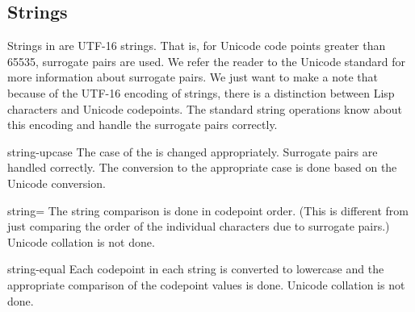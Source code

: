 \subsection{Strings}

Strings in \cmucl{} are UTF-16 strings.  That is, for Unicode code
points greater than 65535, surrogate pairs are used.  We refer the
reader to the Unicode standard for more information about surrogate
pairs.  We just want to make a note that because of the UTF-16
encoding of strings, there is a distinction between Lisp characters
and Unicode codepoints.  The standard string operations know about
this encoding and handle the surrogate pairs correctly.


\begin{defun}{}{string-upcase}{\args {} }
  The case of the  is changed appropriately.  Surrogate
  pairs are handled correctly.  The conversion to the appropriate case
  is done based on the Unicode conversion.
\end{defun}

\begin{defun}{}{string=}{\args {}  }
  The string comparison is done in codepoint order.  (This is
  different from just comparing the order of the individual characters
  due to surrogate pairs.)  Unicode collation is not done.
\end{defun}

\begin{defun}{}{string-equal}{\args {}  }
  Each codepoint in each string is converted to lowercase and the
  appropriate comparison of the codepoint values is done.  Unicode
  collation is not done.
\end{defun}


